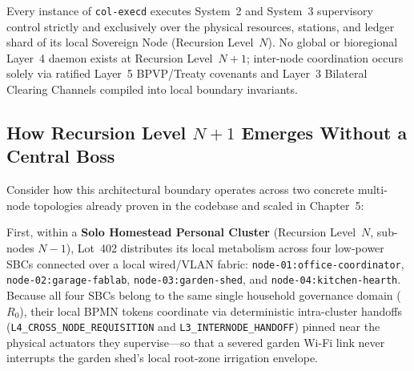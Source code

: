 \begin{invariant}
\label{inv:ch1-vsm-closure}
Every instance of \texttt{col-execd} executes System~2 and System~3 supervisory control
strictly and exclusively over the physical resources, stations, and ledger shard of its
local Sovereign Node (Recursion Level~$N$). No global or bioregional Layer~4 daemon exists
at Recursion Level~$N+1$; inter-node coordination occurs solely via ratified Layer~5
BPVP/Treaty covenants and Layer~3 Bilateral Clearing Channels compiled into local boundary
invariants.
\end{invariant}

\subsection{How Recursion Level $N+1$ Emerges Without a Central Boss}

Consider how this architectural boundary operates across two concrete multi-node topologies
already proven in the codebase and scaled in Chapter~5:

First, within a \textbf{Solo Homestead Personal Cluster} (Recursion Level~$N$, sub-nodes
$N-1$), Lot~402 distributes its local metabolism across four low-power SBCs connected over a
local wired/VLAN fabric: \texttt{node-01:office-coordinator},
\texttt{node-02:garage-fablab}, \texttt{node-03:garden-shed}, and
\texttt{node-04:kitchen-hearth}. Because all four SBCs belong to the same single household
governance domain ($R_0$), their local BPMN tokens coordinate via deterministic
intra-cluster handoffs (\texttt{L4\_CROSS\_NODE\_REQUISITION} and
\texttt{L3\_INTERNODE\_HANDOFF}) pinned near the physical actuators they supervise---so that
a severed garden Wi-Fi link never interrupts the garden shed's local root-zone irrigation
envelope.

